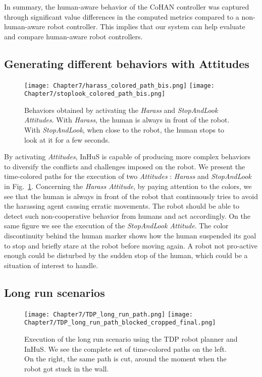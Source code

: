 In summary, the human-aware behavior of the CoHAN controller was captured through significant value differences in the computed metrics compared to a non-human-aware robot controller. This implies that our system can help evaluate and compare human-aware robot controllers.

\subsection{Generating different behaviors with Attitudes}

\begin{figure}
    \centering
    \texttt{[image: Chapter7/harass\_colored\_path\_bis.png]}
    \texttt{[image: Chapter7/stoplook\_colored\_path\_bis.png]}
    \caption{
    Behaviors obtained by activating the \textit{Harass} and \textit{StopAndLook Attitudes}. 
    With \textit{Harass}, the human is always in front of the robot.
    With \textit{StopAndLook}, when close to the robot, the human stops to look at it for a few seconds.
    }
    \label{fig:attitudes}
    \vspace{-0.3cm}
\end{figure}

By activating \textit{Attitudes}, InHuS is capable of producing more complex behaviors to diversify the conflicts and challenges imposed on the robot.
We present the time-colored paths for the execution of two \textit{Attitudes} : \textit{Harass} and \textit{StopAndLook} in Fig.~\ref{fig:attitudes}. Concerning the \textit{Harass Attitude}, by paying attention to the colors, we see that the human is always in front of the robot that continuously tries to avoid the harassing agent causing erratic movements. The robot should be able to detect such non-cooperative behavior from humans and act accordingly.
On the same figure we see the execution of the \textit{StopAndLook Attitude}. The color discontinuity behind the human marker shows how the human suspended its goal to stop and briefly stare at the robot before moving again. A robot not pro-active enough could be disturbed by the sudden stop of the human, which could be a situation of interest to handle. 


\subsection{Long run scenarios}


\begin{figure}
    \centering
    \texttt{[image: Chapter7/TDP\_long\_run\_path.png]}
    \texttt{[image: Chapter7/TDP\_long\_run\_path\_blocked\_cropped\_final.png]}
    \caption{Execution of the long run scenario using the TDP robot planner and InHuS. We see the complete set of time-colored paths on the left. On the right, the same path is cut, around the moment when the robot got stuck in the wall. 
    }
    \label{fig:long_run_block}
    \vspace{-0.3cm}
\end{figure}


